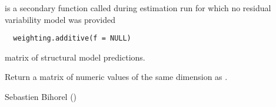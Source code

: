 %
\begin{Description}\relax
{} is a secondary function called during estimation run
for which no residual variability model was provided
\end{Description}
%
\begin{Usage}
\begin{verbatim}
  weighting.additive(f = NULL)
\end{verbatim}
\end{Usage}
%
\begin{Arguments}
\begin{ldescription}
\item[\code{f}] matrix of structural model predictions.
\end{ldescription}
\end{Arguments}
%
\begin{Value}
Return a matrix of numeric values of the same dimension as .
\end{Value}
%
\begin{Author}\relax
Sebastien Bihorel ()
\end{Author}
